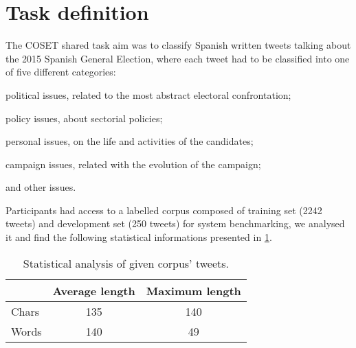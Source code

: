 \section{Task definition} \label{sec:task}

The COSET shared task aim was to classify Spanish written tweets talking about the 2015 Spanish General Election, where each tweet had to be classified into one of five different categories:
\begin{enumerate*}
\item political issues, related to the most abstract electoral confrontation; 
\item policy issues, about sectorial policies; 
\item personal issues, on the life and activities of the candidates; 
\item campaign issues, related with the evolution of the campaign;
\item and other issues.
\end{enumerate*}


Participants had access to a labelled corpus composed of training set (2242 tweets) and development set (250 tweets) for system benchmarking, we analysed it and find the following statistical informations presented in \cref{tab:corpus}.

\begin{table}[h]
\footnotesize
\centering
\begin{tabular}{|l|c|c|}
\hline
			& Average length	& Maximum length	\\ \hline
Chars		& 135				& 140				\\ \hline
Words		& 140				& 49				\\ \hline
\end{tabular}
\caption{Statistical analysis of given corpus' tweets.}
\label{tab:corpus}
\end{table}
